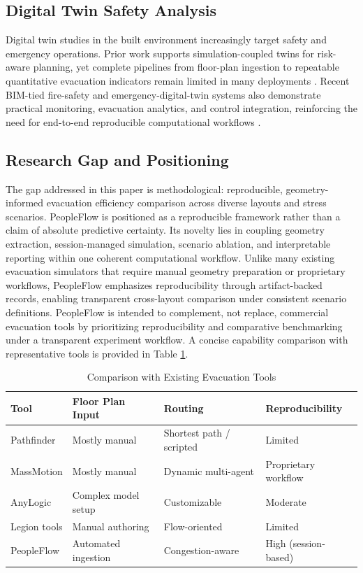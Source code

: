 \documentclass[journal]{IEEEtran}
\begin{document}
\subsection{Digital Twin Safety Analysis}
Digital twin studies in the built environment increasingly target safety and emergency operations. Prior work supports simulation-coupled twins for risk-aware planning, yet complete pipelines from floor-plan ingestion to repeatable quantitative evacuation indicators remain limited in many deployments \cite{batty2012,zhang2021dtwins,ozturk2021dt,osama2024dtframework}. Recent BIM-tied fire-safety and emergency-digital-twin systems also demonstrate practical monitoring, evacuation analytics, and control integration, reinforcing the need for end-to-end reproducible computational workflows \cite{sun2020bimfire,wehbe2021bimfire,ding2023jbe,jiang2023autcon,jahangir2025dt}.

\subsection{Research Gap and Positioning}
The gap addressed in this paper is methodological: reproducible, geometry-informed evacuation efficiency comparison across diverse layouts and stress scenarios. PeopleFlow is positioned as a reproducible framework rather than a claim of absolute predictive certainty. Its novelty lies in coupling geometry extraction, session-managed simulation, scenario ablation, and interpretable reporting within one coherent computational workflow.
Unlike many existing evacuation simulators that require manual geometry preparation or proprietary workflows, PeopleFlow emphasizes reproducibility through artifact-backed records, enabling transparent cross-layout comparison under consistent scenario definitions.
PeopleFlow is intended to complement, not replace, commercial evacuation tools by prioritizing reproducibility and comparative benchmarking under a transparent experiment workflow.
A concise capability comparison with representative tools is provided in Table \ref{tab:tool_comparison}.

\begin{table}[t]
\centering
\caption{Comparison with Existing Evacuation Tools}
\label{tab:tool_comparison}
{\scriptsize
\setlength{\tabcolsep}{3pt}
\begin{tabular}{>{\raggedright\arraybackslash}p{1.60cm} >{\raggedright\arraybackslash}p{1.20cm} >{\raggedright\arraybackslash}p{1.95cm} >{\raggedright\arraybackslash}p{2.00cm}}
\toprule
Tool & Floor Plan Input & Routing & Reproducibility \\
\midrule
Pathfinder & Mostly manual & Shortest path / scripted & Limited \\
MassMotion & Mostly manual & Dynamic multi-agent & Proprietary workflow \\
AnyLogic & Complex model setup & Customizable & Moderate \\
Legion tools & Manual authoring & Flow-oriented & Limited \\
PeopleFlow & Automated ingestion & Congestion-aware & High (session-based) \\
\bottomrule
\end{tabular}
}
\end{table}
\end{document}
